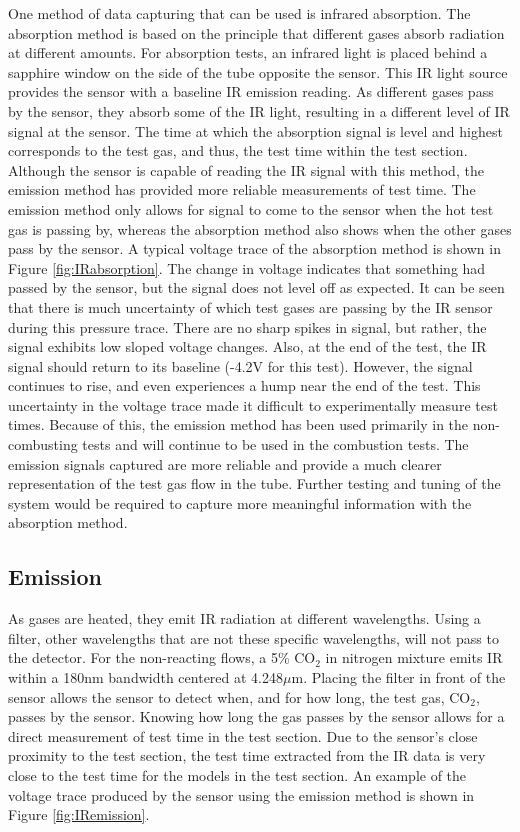 One method of data capturing that can be used is infrared absorption. The absorption method is based on the principle that different gases absorb radiation at different amounts. For absorption tests, an infrared light is placed behind a sapphire window on the side of the tube opposite the sensor. This IR light source provides the sensor with a baseline IR emission reading. As different gases pass by the sensor, they absorb some of the IR light, resulting in a different level of IR signal at the sensor. The time at which the absorption signal is level and highest corresponds to the test gas, and thus, the test time within the test section. Although the sensor is capable of reading the IR signal with this method, the emission method has provided more reliable measurements of test time. The emission method only allows for signal to come to the sensor when the hot test gas is passing by, whereas the absorption method also shows when the other gases pass by the sensor. A typical voltage trace of the absorption method is shown in Figure \ref{fig:IRabsorption}. The change in voltage indicates that something had passed by the sensor, but the signal does not level off as expected. It can be seen that there is much uncertainty of which test gases are passing by the IR sensor during this pressure trace. There are no sharp spikes in signal, but rather, the signal exhibits low sloped voltage changes. Also, at the end of the test, the IR signal should return to its baseline (-4.2V for this test). However, the signal continues to rise, and even experiences a hump near the end of the test. This uncertainty in the voltage trace made it difficult to experimentally measure test times. Because of this, the emission method has been used primarily in the non-combusting tests and will continue to be used in the combustion tests. The emission signals captured are more reliable and provide a much clearer representation of the test gas flow in the tube. Further testing and tuning of the system would be required to capture more meaningful information with the absorption method. 



\subsection{Emission}

As gases are heated, they emit IR radiation at different wavelengths. Using a filter, other wavelengths that are not these specific wavelengths, will not pass to the detector. For the non-reacting flows, a 5\% CO$_2$ in nitrogen mixture emits IR within a 180nm bandwidth centered at 4.248$\mu$m. Placing the filter in front of the sensor allows the sensor to detect when, and for how long, the test gas, CO$_2$, passes by the sensor. Knowing how long the gas passes by the sensor allows for a direct measurement of test time in the test section. Due to the sensor's close proximity to the test section, the test time extracted from the IR data is very close to the test time for the models in the test section. An example of the voltage trace produced by the sensor using the emission method is shown in Figure \ref{fig:IRemission}. 


